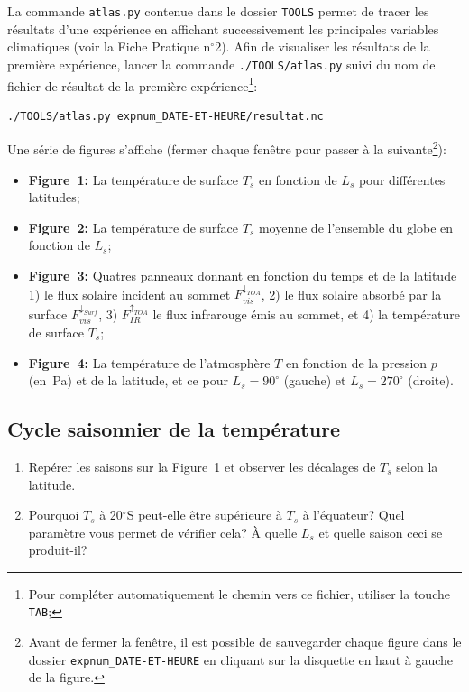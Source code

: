 \documentclass[a4paper,12pt]{article}
\begin{document}
La commande \texttt{atlas.py} contenue dans le dossier \texttt{TOOLS} permet de
tracer les résultats d'une expérience en affichant successivement les
principales variables climatiques (voir la Fiche Pratique n$^\circ$2). Afin de
visualiser les résultats de la première expérience, lancer la commande \texttt
{./TOOLS/atlas.py} suivi du nom de fichier de résultat de la première
expérience\footnote{Pour compléter automatiquement le chemin vers ce fichier,
utiliser la touche \texttt{TAB};}:

\begin{verbatim}
./TOOLS/atlas.py expnum_DATE-ET-HEURE/resultat.nc
\end{verbatim}

Une série de figures s'affiche (fermer chaque fenêtre pour passer à la
suivante\footnote{Avant de fermer la fenêtre, il est possible de sauvegarder
chaque figure dans le dossier
\texttt{expnum\-\_DATE\--ET\--HEURE} en cliquant sur la disquette en haut à
gauche de la figure.}):
\begin{itemize}
\item \textbf{Figure~1:} La température de surface $T_s$ en fonction de $L_s$
pour différentes latitudes;
\item \textbf{Figure~2:} La température de surface $T_s$ moyenne de l'ensemble
du globe en fonction de $L_s$;
\item \textbf{Figure~3:} Quatres panneaux donnant en fonction du temps et de la
latitude 1) le flux solaire incident au sommet $F_{vis}^{\downarrow_{TOA}}$, 2)
le flux solaire absorbé par la surface $F_{vis}^{\downarrow_{Surf}}$, 3) $F_
{IR}^{\uparrow_{TOA}}$ le flux infrarouge émis au sommet, et 4) la température
de surface $T_s$;
\item \textbf{Figure~4:} La température de l'atmosphère $T$ en fonction de la
pression $p$ (en~Pa) et de la latitude, et ce pour $L_s=90^\circ$ (gauche) et
$L_s=270^\circ$ (droite).
\end{itemize}

\subsection{Cycle saisonnier de la température}

\begin{enumerate}
\item Repérer les saisons sur la Figure~1 et observer les décalages de $T_s$
selon la latitude.
\item Pourquoi $T_s$ à 20$^\circ$S peut-elle être supérieure à $T_s$ à
l'équateur? Quel paramètre vous permet de vérifier cela? \`A quelle $L_s$ et
quelle saison ceci se produit-il?
\end{enumerate}
\end{document}
